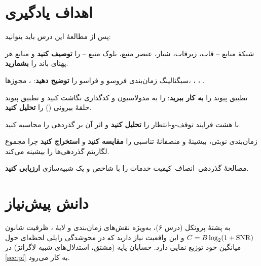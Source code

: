\documentclass[11pt,a4paper]{article}
\begin{document}
\ACNcover

\section{اهداف یادگیری}
پس از مطالعهٔ این درس باید بتوانید:
\begin{objectives}
  \item شبکهٔ منابع  -- قاب، زیرقاب، شیار، عنصر منبع، بلوک منبع -- را \textbf{توصیف کنید} و منابع
        هر پهنای باند  را \textbf{بشمارید}.
  \item سیگنالینگ زمان‌بندی فروسو و فراسو را \textbf{توضیح دهید}: ، مجوزها، ، ، .
  \item تطبیق پیوند را \textbf{به کار ببرید}:  را به مدولاسیون و کدگذاری نگاشت کنید و تطبیق پیوند
        حلقهٔ بیرونی () را \textbf{تحلیل کنید}.
  \item {} با هشت فرایند توقف-و-انتظار را \textbf{تحلیل کنید} و اثر آن بر گذردهی را محاسبه کنید.
  \item زمان‌بندی نوبتی، بیشینهٔ  و منصفانهٔ تناسبی را \textbf{مقایسه کنید} و \textbf{استخراج کنید} چرا
         مجموع لگاریتم گذردهی‌ها را بیشینه می‌کند.
  \item مصالحهٔ گذردهی--انصاف--کیفیت خدمات را با شاخص  و یک شبیه‌سازی \textbf{ارزیابی کنید}.
\end{objectives}

\section{دانش پیش‌نیاز}
به پشتهٔ پروتکل  (درس ۶)، به‌ویژه نقش‌های زمان‌بندی و  لایهٔ ، ظرفیت شانون
$C = B\log_2(1+\mathrm{SNR})$ و این واقعیت نیاز دارید که در محوشدگی رایلی  لحظه‌ای حول میانگین خود توزیع
نمایی دارد. حسابان پایه (مشتق، استدلال‌های شبیه لاگرانژ) در \cref{sec:pf} به کار می‌رود.
\end{document}
